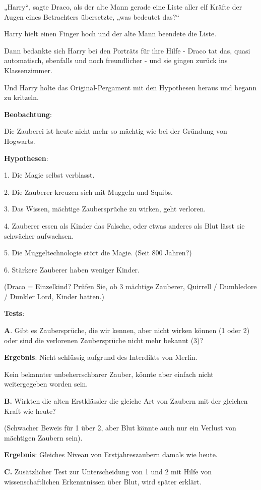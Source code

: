 {„Harry“, sagte Draco, als der alte Mann gerade eine Liste aller elf Kräfte der Augen eines Betrachters übersetzte, „was bedeutet das?“

Harry hielt einen Finger hoch und der alte Mann beendete die Liste.

Dann bedankte sich Harry bei den Porträts für ihre Hilfe - Draco tat das, quasi automatisch, ebenfalls und noch freundlicher - und sie gingen zurück ins Klassenzimmer.

Und Harry holte das Original-Pergament mit den Hypothesen heraus und begann zu kritzeln.

\textbf{Beobachtung}:

Die Zauberei ist heute nicht mehr so mächtig wie bei der Gründung von Hogwarts.

\textbf{Hypothesen}:

1. Die Magie selbst verblasst.

2. Die Zauberer kreuzen sich mit Muggeln und Squibs.

3. Das Wissen, mächtige Zaubersprüche zu wirken, geht verloren.

4. Zauberer essen als Kinder das Falsche, oder etwas anderes als Blut lässt sie schwächer aufwachsen.

5. Die Muggeltechnologie stört die Magie. (Seit 800 Jahren?)

6. Stärkere Zauberer haben weniger Kinder.

(Draco = Einzelkind? Prüfen Sie, ob 3 mächtige Zauberer, Quirrell / Dumbledore / Dunkler Lord, Kinder hatten.)

\textbf{Tests}:

\textbf{A}. Gibt es Zaubersprüche, die wir kennen, aber nicht wirken können (1 oder 2) oder sind die verlorenen Zaubersprüche nicht mehr bekannt (3)?

\textbf{Ergebnis}: Nicht schlüssig aufgrund des Interdikts von Merlin.

Kein bekannter unbeherrschbarer Zauber, könnte aber einfach nicht weitergegeben worden sein.

\textbf{B.} Wirkten die alten Erstklässler die gleiche Art von Zaubern mit der gleichen Kraft wie heute?

(Schwacher Beweis für 1 über 2, aber Blut könnte auch nur ein Verlust von mächtigen Zaubern sein).

\textbf{Ergebnis}: Gleiches Niveau von Erstjahreszaubern damals wie heute.

\textbf{C.} Zusätzlicher Test zur Unterscheidung von 1 und 2 mit Hilfe von wissenschaftlichen Erkenntnissen über Blut, wird später erklärt.

}
